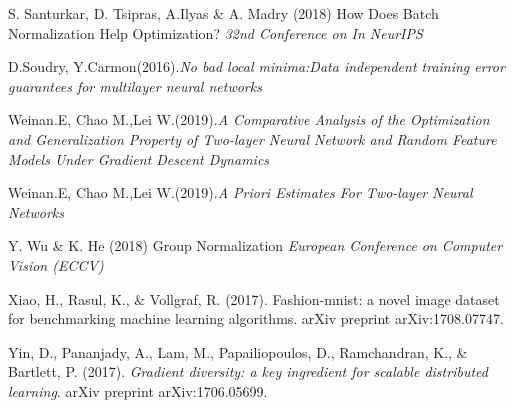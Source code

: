 \documentclass{article}
\begin{document}
\begin{thebibliography}{9}
S. Santurkar, D. Tsipras, A.Ilyas \& A. Madry (2018) How Does Batch Normalization Help Optimization? \textit{32nd Conference on In NeurIPS}

D.Soudry, Y.Carmon(2016).\textit{No bad local minima:Data independent training error guarantees for multilayer neural networks}

Weinan.E, Chao M.,Lei W.(2019).\textit{A Comparative Analysis of the Optimization and Generalization Property of Two-layer Neural Network and Random Feature Models Under Gradient Descent Dynamics}

Weinan.E, Chao M.,Lei W.(2019).\textit{A Priori Estimates For Two-layer Neural Networks}

Y. Wu \& K. He (2018) Group Normalization \textit{European Conference on Computer Vision (ECCV)}

Xiao, H., Rasul, K., \& Vollgraf, R. (2017). Fashion-mnist: a novel image dataset for benchmarking machine learning algorithms. arXiv preprint arXiv:1708.07747.

Yin, D., Pananjady, A., Lam, M., Papailiopoulos, D., Ramchandran, K., \& Bartlett, P. (2017). \textit{Gradient diversity: a key ingredient for scalable distributed learning}. arXiv preprint arXiv:1706.05699.


\end{thebibliography}
\end{document}
